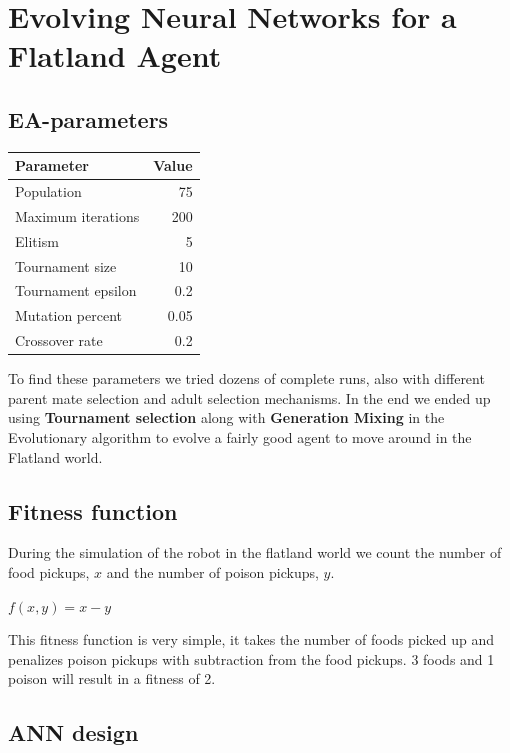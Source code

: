 \section{Evolving Neural Networks for a Flatland Agent}
\subsection{EA-parameters}
\begin{center}

\begin{tabular}{p{5cm} | r}
\textbf{Parameter} & \textbf{Value} \\
\hline
Population & 75 \\
Maximum iterations & 200 \\
Elitism & 5 \\
Tournament size & 10 \\
Tournament epsilon & 0.2 \\
Mutation percent & 0.05 \\
Crossover rate & 0.2 \\
\hline
\end{tabular}
\end{center}

To find these parameters we tried dozens of complete runs, also with different parent mate selection and adult selection mechanisms. In the end we ended up using \textbf{Tournament selection} along with \textbf{Generation Mixing} in the Evolutionary algorithm to evolve a fairly good agent to move around in the Flatland world.

\subsection{Fitness function}
During the simulation of the robot in the flatland world we count the number of food pickups, $x$ and the number of poison pickups, $y$. 
\begin{center}
	$f(x, y) = x - y$
\end{center}

This fitness function is very simple, it takes the number of foods picked up and penalizes poison pickups with subtraction from the food pickups. 3 foods and 1 poison will result in a fitness of 2.

\subsection{ANN design}

